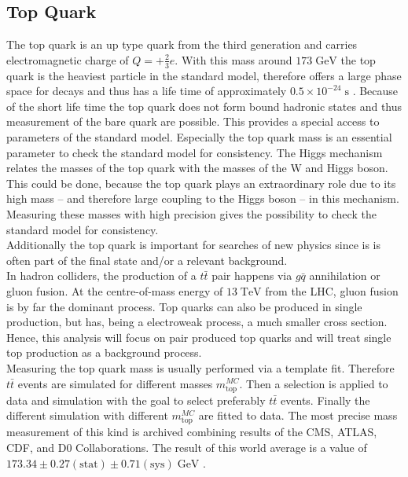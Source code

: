 \subsection{Top Quark}
	The top quark is an up type quark from the third generation and carries electromagnetic charge of $Q=+\frac{2}{3}e$. With this mass around $173\;\text{GeV}$ the top quark is the heaviest particle in the standard model, therefore offers a large phase space for decays and thus has a life time of approximately $0.5 \times 10^{-24}\;\text{s}$ \cite{pdg2016}. Because of the short life time the top quark does not form bound hadronic states and thus measurement of the bare quark are possible. This provides a special access to parameters of the standard model. Especially the top quark mass is an essential parameter to check the standard model for consistency. The Higgs mechanism relates the masses of the top quark with the masses of the W and Higgs boson. This could be done, because the top quark plays an extraordinary role due to its high mass -- and therefore large coupling to the Higgs boson -- in this mechanism. Measuring these masses with high precision gives the possibility to check the standard model for consistency. 
	\\
	Additionally the top quark is important for searches of new physics since is is often part of the final state and/or a relevant background. 
	\\
	In hadron colliders, the production of a $t\bar{t}$ pair happens via $g\bar{q}$ annihilation or gluon fusion. At the centre-of-mass energy of $13\;\text{TeV}$ from the LHC, gluon fusion is by far the dominant process. Top quarks can also be produced in single production, but has, being a electroweak process, a much smaller cross section. Hence, this analysis will focus on pair produced top quarks and will treat single top production as a background process.
	\\
	Measuring the top quark mass is usually performed via a template fit. Therefore $t\bar{t}$ events are simulated for different masses $m_\text{top}^{MC}$. Then a selection is applied to data and simulation with the goal to select preferably $t\bar{t}$ events. Finally the different simulation with different $m_\text{top}^{MC}$ are fitted to data.	The most precise mass measurement of this kind is archived combining results of the CMS, ATLAS, CDF, and D0 Collaborations. The result of this world average is a value of $173.34 \pm 0.27 (\text{stat}) \pm 0.71 (\text{sys})\;\text{GeV}$ \cite{topmass_combination}. 
